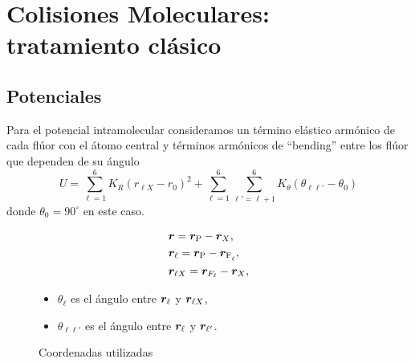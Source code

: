 \chapter{Colisiones Moleculares: tratamiento cl\'{a}sico}
\label{C:colis-molec}


\section{Potenciales}
\label{S:potenciales}

Para el potencial intramolecular consideramos un t\'{e}rmino el\'{a}stico arm\'{o}nico de cada fl\'{u}or con el \'{a}tomo central y t\'{e}rminos arm\'{o}nicos de ``bending'' entre los fl\'{u}or que dependen de su \'{a}ngulo
\begin{equation}\label{Q:pot-intra-energy}
  U = \sum_{\ell=1}^{6} K_{R} (r_{\ell X} - r_{0})^{2} + \sum_{\ell=1}^{6} \sum_{\ell'=\ell + 1}^{6} K_{\theta} (\theta_{\ell \ell'} - \theta_{0})
\end{equation}
%
donde $\theta_{0}=90^{\circ}$  en este caso.
  \begin{figure}[htbp]
\begin{minipage}{0.5\textwidth}
    \centering \resizebox{.8\linewidth}{!}{}
% 
    \caption{Coordenadas utilizadas}
\end{minipage}\hfill
\begin{minipage}{0.4\textwidth}
  \begin{subequations}
    \begin{align}
      &\vect{r}=  \vect{r}_{\ce{P}} - \vect{r}_{X} , \\
      &\vect{r}_{\ell}=  \vect{r}_{\ce{P}} - \vect{r}_{\ce{F_{\ell}}} , \\
      &\vect{r}_{\ell X}= \vect{r}_{F_{\ell}} - \vect{r}_{X} ,
    \end{align}
  \end{subequations}
  \begin{itemize}
  \item $\theta_{\ell}$ es el \'{a}ngulo entre $\bm{r}_{\ell}$ y $\bm{r}_{\ell X}$,
  \item $\theta_{\ell \ell'}$ es el \'{a}ngulo entre $\bm{r}_{\ell}$ y $\bm{r}_{\ell'}$.
  \end{itemize}
\end{minipage}
\end{figure}

